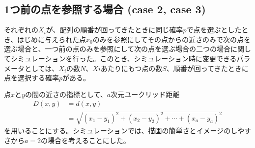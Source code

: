 \subsection{1つ前の点を参照する場合 (case 2, case 3)}

それぞれの$X_{i}$が、配列の順番が回ってきたときに同じ確率$p$で点を選ぶとしたとき、はじめに与えられた点$x_{0}$のみを参照にしてその点からの近さのみで次の点を選ぶ場合と、一つ前の点のみを参照にして次の点を選ぶ場合の二つの場合に関してシミュレーションを行った。このとき、シミュレーション時に変更できるパラメータとしては、$X_{i}$の数$N$、$X{i}$あたりにもつ点の数$S$、順番が回ってきたときに点を選択する確率$p$がある。

点$x$と$y$の間の近さの指標として、$a$次元ユークリッド距離
\begin{align}D(x, y) &= d(x,y) \nonumber\\
&= \sqrt{(x_{1} - y_{1})^{2} + (x_{2} - y_{2})^{2} + \cdots + (x_{a} - y_{a})^{2}}\end{align}
を用いることにする。シミュレーションでは、描画の簡単さとイメージのしやすさから$a=2$の場合を考えることにした。

